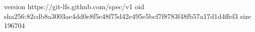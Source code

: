 version https://git-lfs.github.com/spec/v1
oid sha256:82cdb8a3003ae4dd0e8f5e48f75d42e495e5bcf7f8783f48fb57a17d1d4ffef3
size 196704
